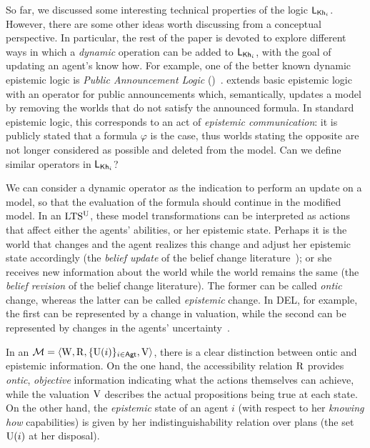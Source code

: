So far, we discussed some interesting technical properties of the logic $\mathsf{L}_{{\sf Kh}_i}$. However, there are some other ideas worth discussing from a conceptual perspective. In particular, the rest of the paper is devoted to explore different ways in which a \emph{dynamic} operation can be added to $\mathsf{L}_{{\sf Kh}_i}$, with the goal of updating an agent's know how.   For example, one of the better known dynamic epistemic logic is \emph{Public Announcement Logic} (\PAL)~\cite{Plaza89:lopc}.  \PAL extends basic epistemic logic with an operator for public announcements which, semantically, updates a model by removing the worlds that do not satisfy the announced formula. In standard epistemic logic, this corresponds to an act of \emph{epistemic communication}: it is publicly stated that a formula $\varphi$ is the case, thus worlds stating the opposite are not longer considered as possible and deleted from the model.  Can we define similar operators in $\mathsf{L}_{{\sf Kh}_i}$?

We can consider a dynamic operator as the indication to perform an update on a model, so that the evaluation of the formula should continue in the modified model.  In an $\textup{LTS$^\text{\textup{U}}$}$, these model transformations can be interpreted as actions that affect either the agents' abilities, or her epistemic state. 
Perhaps it is the world that changes and the agent realizes this change and adjust her epistemic state accordingly (the \emph{belief update} of the belief change literature~\cite{sep-logic-belief-revision}); or she receives new information about the world while the world remains the same (the \emph{belief revision} of the belief change literature). The former can be called \emph{ontic} change, whereas the latter can be called \emph{epistemic} change. In DEL, for example, the first can be represented by a change in valuation, while the second can be represented by changes in the agents' uncertainty~\cite{vanDitmarschKooi2008}.

In an \ults $\mathcal{M}=\langle \operatorname{W},\operatorname{R},\{ \operatorname{U}(i) \}_{i\in{\rm \sf Agt}},\operatorname{V} \rangle$, there is a clear distinction between ontic and epistemic information. On the one hand, the accessibility relation $\operatorname{R}$ provides \emph{ontic}, \emph{objective} information indicating what the actions themselves can achieve, while the valuation $\operatorname{V}$ describes the actual propositions being true at each state. On the other hand, the \emph{epistemic} state of an agent $i$ (with respect to her \emph{knowing how} capabilities) is given by her indistinguishability relation over plans (the set $\operatorname{U}(i)$ at her disposal). 

